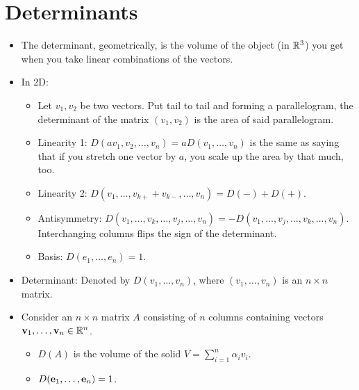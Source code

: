 \documentclass[../../notes.tex]{subfiles}
\begin{document}
\chapter{Determinants}
\begin{itemize}
    \item {}The determinant, geometrically, is the volume of the object (in $\mathbb{R}^3$) you get when you take linear combinations of the vectors.
    \item In 2D:
    \begin{itemize}
        \item Let $v_1,v_2$ be two vectors. Put tail to tail and forming a parallelogram, the determinant of the matrix $(v_1,v_2)$ is the area of said parallelogram.
        \item Linearity 1: $D(av_1,v_2,\dots,v_n)=aD(v_1,\dots,v_n)$ is the same as saying that if you stretch one vector by $a$, you scale up the area by that much, too.
        \item Linearity 2: $D(v_1,\dots,v_{k+}+v_{k-},\dots,v_n)=D(-)+D(+)$.
        \item Antisymmetry: $D(v_1,\dots,v_k,\dots,v_j,\dots,v_n)=-D(v_1,\dots,v_j,\dots,v_k,\dots,v_n)$. Interchanging columns flips the sign of the determinant.
        \item Basis: $D(e_1,\dots,e_n)=1$.
    \end{itemize}
    \item Determinant: Denoted by $D(v_1,\dots,v_n)$, where $(v_1,\dots,v_n)$ is an $n\times n$ matrix.
    \item {}Consider an $n\times n$ matrix $A$ consisting of $n$ columns containing vectors $\mathbf{v}_1,\dots,\mathbf{v}_n\in\mathbb{R}^n$.
    \begin{itemize}
        \item $D(A)$ is the volume of the solid $V=\sum_{i=1}^n\alpha_iv_i$.
        \item $D(\mathbf{e}_1,\dots,\mathbf{e}_n)=1$.
    \end{itemize}
    \begin{figure}[h!]
        \centering
        \footnotesize
        \begin{subfigure}[b]{0.45\linewidth}
            \centering
\end{subfigure}
\end{figure}
\end{itemize}
\end{document}
